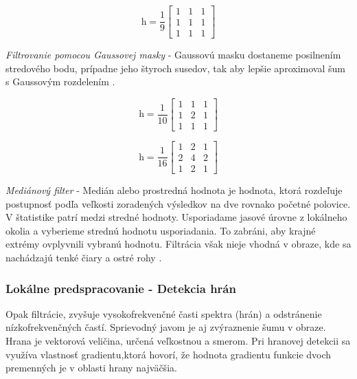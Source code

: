 $$\textit{h}=\frac{1}{9}\begin{bmatrix} 1 & 1 & 1 \\ 1 & 1 & 1 \\ 1 & 1 & 1  \end{bmatrix}$$

\textit{Filtrovanie pomocou Gaussovej masky} - Gaussovú masku dostaneme posilnením stredového bodu, prípadne jeho štyroch susedov, tak aby lepšie aproximoval šum s Gaussovým rozdelením \cite{Detekcia_a_rozpoznavanie_objektov}.


\begin{figure}[H]
    \centering
    \begin{minipage}[b]{0.49\textwidth}
        $$\textit{h}=\frac{1}{10}\begin{bmatrix} 1 & 1 & 1 \\ 1 & 2 & 1 \\ 1 & 1 & 1  \end{bmatrix}$$
    \end{minipage}
    \hfill
    \begin{minipage}[b]{0.49\textwidth}
        $$\textit{h}=\frac{1}{16}\begin{bmatrix} 1 & 2 & 1 \\ 2 & 4 & 2 \\ 1 & 2 & 1  \end{bmatrix}$$
    \end{minipage}
\end{figure}


\textit{Mediánový filter} - Medián alebo prostredná hodnota je hodnota, ktorá rozdeľuje postupnosť podľa veľkosti zoradených výsledkov na dve rovnako početné polovice. V štatistike patrí medzi stredné hodnoty. Usporiadame jasové úrovne z lokálneho okolia a vyberieme strednú hodnotu usporiadania. To zabráni, aby krajné extrémy ovplyvnili vybranú hodnotu. Filtrácia však nieje vhodná v obraze, kde sa nachádzajú tenké čiary a ostré rohy \cite{Detekcia_a_rozpoznavanie_objektov}. 


\subsubsection{Lokálne predspracovanie - Detekcia hrán}
Opak filtrácie, zvyšuje vysokofrekvenčné časti spektra (hrán) a odstránenie nízkofrekvenčných častí. Sprievodný javom je aj zvýraznenie šumu v obraze.  Hrana je vektorová veličina, určená veľkostnou a smerom. Pri hranovej detekcii sa využíva vlastnosť gradientu,ktorá hovorí, že hodnota gradientu funkcie dvoch premenných je v oblasti hrany najväčšia. 

